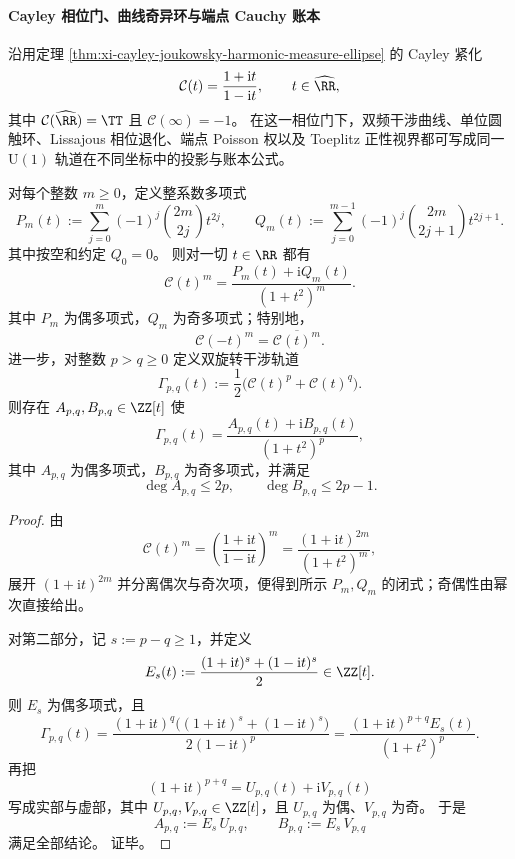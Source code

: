\paragraph{Cayley 相位门、曲线奇异环与端点 Cauchy 账本}
沿用定理 \ref{thm:xi-cayley-joukowsky-harmonic-measure-ellipse} 的 Cayley 紧化
\[
\mathcal C(t)=\frac{1+\mathrm{i}t}{1-\mathrm{i}t},
\qquad t\in\widehat{\RR},
\]
其中 \(\mathcal C(\widehat{\RR})=\TT\) 且 \(\mathcal C(\infty)=-1\)。
在这一相位门下，双频干涉曲线、单位圆触环、Lissajous 相位退化、端点 Poisson 权以及 Toeplitz 正性视界都可写成同一 \(\mathrm{U}(1)\) 轨道在不同坐标中的投影与账本公式。

\begin{theorem}\label{thm:xi-cayley-phase-double-rotation-rational-parity}
对每个整数 \(m\ge 0\)，定义整系数多项式
\[
P_m(t):=\sum_{j=0}^{m}(-1)^j\binom{2m}{2j}t^{2j},
\qquad
Q_m(t):=\sum_{j=0}^{m-1}(-1)^j\binom{2m}{2j+1}t^{2j+1}.
\]
其中按空和约定 \(Q_0=0\)。
则对一切 \(t\in\RR\) 都有
\[
\boxed{\;
\mathcal C(t)^m=\frac{P_m(t)+\mathrm{i}Q_m(t)}{(1+t^2)^m}.\;}
\]
其中 \(P_m\) 为偶多项式，\(Q_m\) 为奇多项式；特别地，
\[
\mathcal C(-t)^m=\overline{\mathcal C(t)^m}.
\]
进一步，对整数 \(p>q\ge 0\) 定义双旋转干涉轨道
\[
\Gamma_{p,q}(t):=\frac12\bigl(\mathcal C(t)^p+\mathcal C(t)^q\bigr).
\]
则存在 \(A_{p,q},B_{p,q}\in\ZZ[t]\) 使
\[
\boxed{\;
\Gamma_{p,q}(t)=\frac{A_{p,q}(t)+\mathrm{i}B_{p,q}(t)}{(1+t^2)^p},\;}
\]
其中 \(A_{p,q}\) 为偶多项式，\(B_{p,q}\) 为奇多项式，并满足
\[
\deg A_{p,q}\le 2p,
\qquad
\deg B_{p,q}\le 2p-1.
\]
\end{theorem}
\begin{proof}
由
\[
\mathcal C(t)^m
=
\left(\frac{1+\mathrm{i}t}{1-\mathrm{i}t}\right)^m
=
\frac{(1+\mathrm{i}t)^{2m}}{(1+t^2)^m},
\]
展开 \((1+\mathrm{i}t)^{2m}\) 并分离偶次与奇次项，便得到所示 \(P_m,Q_m\) 的闭式；奇偶性由幂次直接给出。
\par
对第二部分，记 \(s:=p-q\ge 1\)，并定义
\[
E_s(t):=\frac{(1+\mathrm{i}t)^s+(1-\mathrm{i}t)^s}{2}\in\ZZ[t].
\]
则 \(E_s\) 为偶多项式，且
\[
\Gamma_{p,q}(t)
=
\frac{(1+\mathrm{i}t)^q\bigl((1+\mathrm{i}t)^s+(1-\mathrm{i}t)^s\bigr)}{2(1-\mathrm{i}t)^p}
=
\frac{(1+\mathrm{i}t)^{p+q}E_s(t)}{(1+t^2)^p}.
\]
再把
\[
(1+\mathrm{i}t)^{p+q}=U_{p,q}(t)+\mathrm{i}V_{p,q}(t)
\]
写成实部与虚部，其中 \(U_{p,q},V_{p,q}\in\ZZ[t]\)，且 \(U_{p,q}\) 为偶、\(V_{p,q}\) 为奇。
于是
\[
A_{p,q}:=E_s\,U_{p,q},
\qquad
B_{p,q}:=E_s\,V_{p,q}
\]
满足全部结论。
证毕。
\end{proof}

